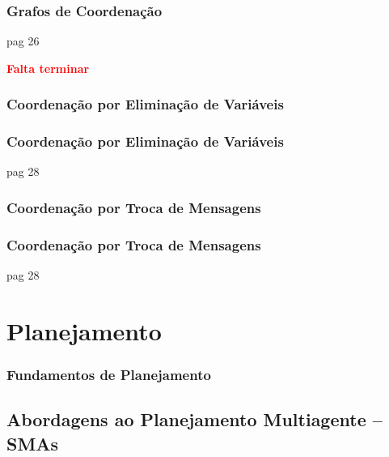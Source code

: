 \begin{frame}
\frametitle{Grafos de Coordenação}

pag 26


\begin{huge}

\textbf{ \textcolor{red}{Falta terminar}}
 

\end{huge}
\end{frame}


\subsubsection{Coordenação por Eliminação de Variáveis}

\begin{frame}
\frametitle{Coordenação por Eliminação de Variáveis}

pag 28


\end{frame}


\subsubsection{Coordenação por Troca de Mensagens}

\begin{frame}
\frametitle{Coordenação por Troca de Mensagens}

pag 28


\end{frame}

\section{Planejamento}


\begin{frame}
\frametitle{Fundamentos de Planejamento}



\end{frame}


\subsection{Abordagens ao Planejamento Multiagente -- SMAs}

